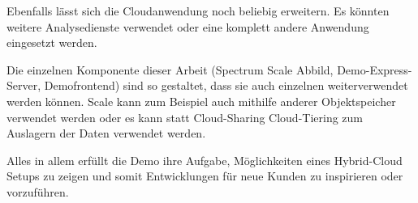 Ebenfalls lässt sich die Cloudanwendung noch beliebig erweitern. Es könnten weitere Analysedienste verwendet oder eine komplett andere Anwendung eingesetzt werden.

Die einzelnen Komponente dieser Arbeit (Spectrum Scale Abbild, Demo-Express-Server, Demofrontend) sind so gestaltet, dass sie auch einzelnen weiterverwendet werden können. Scale kann zum Beispiel auch mithilfe anderer Objektspeicher verwendet werden oder es kann statt Cloud-Sharing Cloud-Tiering zum Auslagern der Daten verwendet werden.

Alles in allem erfüllt die Demo ihre Aufgabe, Möglichkeiten eines Hybrid-Cloud Setups zu zeigen und somit Entwicklungen für neue Kunden zu inspirieren oder vorzuführen. 